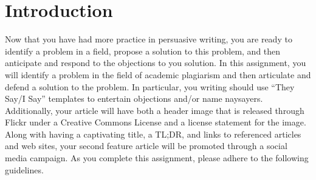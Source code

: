 

\usepackage[compact]{titlesec}




\vspace*{-.2in}
\section*{Introduction}

Now that you have had more practice in persuasive writing, you are ready to identify a problem in a field, propose a
solution to this problem, and then anticipate and respond to the objections to you solution. In this assignment, you
will identify a problem in the field of academic plagiarism and then articulate and defend a solution to the problem. In
particular, you writing should use ``They Say/I Say'' templates to entertain objections and/or name naysayers.
Additionally, your article will have both a header image that is released through Flickr under a Creative Commons
License and a license statement for the image. Along with having a captivating title, a TL;DR, and links to referenced
articles and web sites, your second feature article will be promoted through a social media campaign. As you complete
this assignment, please adhere to the following guidelines.

